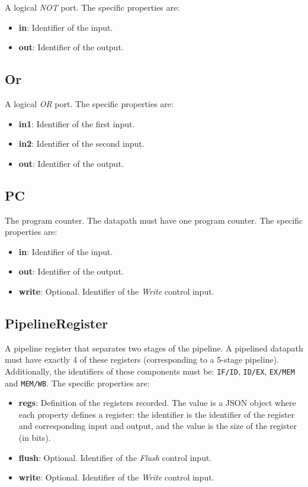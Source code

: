 \documentclass[11pt,a4paper,twoside,titlepage]{report}
\begin{document}
A logical \emph{NOT} port. The specific properties are:
\begin{itemize}
	\item \textbf{in}: Identifier of the input.
	\item \textbf{out}: Identifier of the output.
\end{itemize}

\subsection{Or}

A logical \emph{OR} port. The specific properties are:
\begin{itemize}
	\item \textbf{in1}: Identifier of the first input.
	\item \textbf{in2}: Identifier of the second input.
	\item \textbf{out}: Identifier of the output.
\end{itemize}

\subsection{PC}

The program counter. The datapath must have one program counter.
The specific properties are:
\begin{itemize}
	\item \textbf{in}: Identifier of the input.
	\item \textbf{out}: Identifier of the output.
	\item \textbf{write}: Optional. Identifier of the \emph{Write} control input.
\end{itemize}

\subsection{PipelineRegister}

A pipeline register that separates two stages of the pipeline.
A pipelined datapath must have exactly 4 of these registers (corresponding to a
5-stage pipeline). Additionally, the identifiers of these components must be:
\verb+IF/ID+, \verb+ID/EX+, \verb+EX/MEM+ and \verb+MEM/WB+.
The specific properties are:
\begin{itemize}
	\item \textbf{regs}: Definition of the registers recorded. The value is a
		JSON object where each property defines a register: the identifier is
		the identifier of the register and corresponding input and output, and
		the value is the size of the register (in bits).
	\item \textbf{flush}: Optional. Identifier of the \emph{Flush} control input.
	\item \textbf{write}: Optional. Identifier of the \emph{Write} control input.
\end{itemize}
\end{document}
